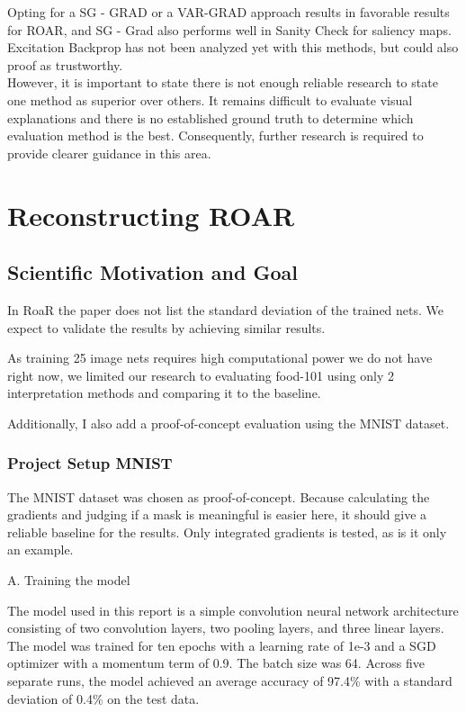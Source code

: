 Opting for  a SG - GRAD or a VAR-GRAD approach results in favorable results for ROAR, and  SG - Grad also performs well in Sanity Check for saliency maps. Excitation Backprop has not been analyzed yet with this methods, but could also proof as trustworthy. \\
However, it is important to state there is not enough reliable research to state one method as superior over others. It remains difficult to evaluate visual explanations and there is no established ground truth to determine which evaluation method is the best. Consequently, further research is required to provide clearer guidance in this area.


\chapter{Reconstructing ROAR} %
\label{sec:project}


\section{Scientific Motivation and Goal}
In RoaR\cite{hooker2019benchmark} the paper does not list the standard deviation of the trained nets. We expect to validate the results by achieving similar results.

As training 25 image nets requires high computational power we do not have right now, we limited our research to evaluating food-101 \cite{bossard14} using only 2 interpretation methods and comparing it to the baseline.


Additionally, I also add a proof-of-concept evaluation using the MNIST dataset.



\subsection{Project Setup MNIST}

The MNIST dataset \cite{deng2012mnist} was chosen as proof-of-concept. Because calculating the gradients and judging if a mask is meaningful is easier here, it should give a reliable baseline for the results. Only integrated gradients is tested, as is it only an example.

A. Training the model

The model used in this report is a simple convolution neural network architecture consisting of two convolution layers, two pooling layers, and three linear layers. The model was trained for ten epochs with a learning rate of 1e-3 and a SGD optimizer with a momentum term of 0.9. The batch size was 64. Across five separate runs, the model achieved an average accuracy of 97.4\% with a standard deviation of 0.4\% on the test data.

